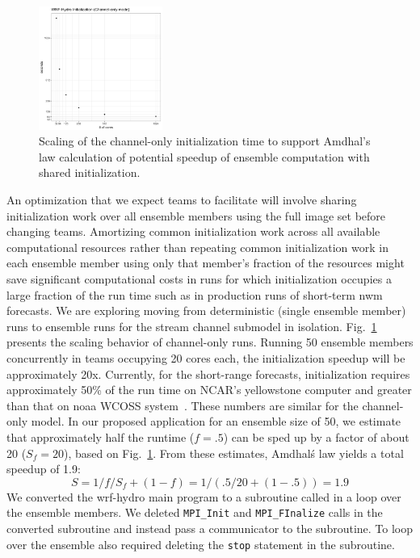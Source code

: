 \begin{figure}
\includegraphics[width=0.36\textwidth]{figures/init_timing_linear.png}
\vspace{-7pt}
\caption{Scaling of the channel-only initialization time to
  support Amdhal's law calculation of potential speedup of ensemble
  computation with shared initialization. \label{fig:wrf-hydro-init-scaling}}
\end{figure}

An optimization that we expect teams to facilitate will involve sharing initialization
work over all ensemble members using
the full image set before changing teams. Amortizing common
initialization work across all available computational resources
rather than repeating common initialization work in each
ensemble member using only that member's fraction of the resources might
save significant computational costs in runs for which
initialization occupies a large fraction of
the run time such as in production runs of short-term \gls{nwm}
forecasts. We are exploring
moving from deterministic
(single ensemble member) runs to ensemble runs for the stream
channel submodel in isolation. Fig.~\ref{fig:wrf-hydro-init-scaling}
presents the scaling behavior of channel-only runs.
Running 50 ensemble members concurrently in
teams occupying 20 cores each, the initialization speedup will be
approximately 20x. Currently, for the short-range forecasts,
initialization requires approximately 50\% of the run time on
NCAR's yellowstone computer and greater than that on \gls{noaa} WCOSS
system~\cite{yuetal2017}. These numbers are
similar for the channel-only model. In our proposed application for an ensemble size of 50, we estimate that
approximately half the runtime ($f=.5$) can be sped up by a factor of
about 20 ($S_f=20$), based on Fig.~\ref{fig:wrf-hydro-init-scaling}. From
these estimates, Amdhal\'s law yields a total speedup
of 1.9:
\begin{equation}
S = 1 / { f/S_f + (1-f) } = 1 / (.5/20 + (1-.5)) = 1.9
\end{equation}
We converted the \gls{wrf-hydro} main program to a subroutine
called in a loop over the ensemble members.
We deleted \texttt{MPI\_Init} and \texttt{MPI\_FInalize} calls in the converted
subroutine and instead pass a communicator to the subroutine.  To
loop over the ensemble also required deleting the \texttt{stop} statement in the
subroutine.

